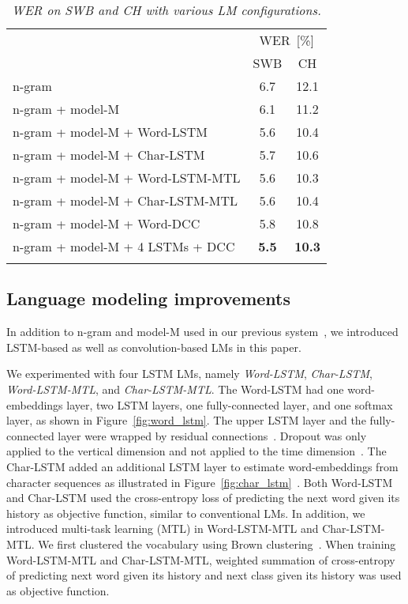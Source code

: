\documentclass[a4paper]{article}
\def\thline{\noalign{\hrule height 1pt}}
\begin{document}
\begin{table}[t]
 \begin{center}
  \begin{tabular*}{\columnwidth}{@{\extracolsep{\fill}}lcc}
   \thline
   ~&\multicolumn{2}{c}{WER~[\%]} \\
   ~& SWB & CH \\
   \thline
   n-gram & 6.7 & 12.1 \\
   n-gram + model-M & 6.1 & 11.2 \\
   \hline
   n-gram + model-M + Word-LSTM& 5.6 & 10.4 \\
   n-gram + model-M + Char-LSTM& 5.7 & 10.6 \\
   n-gram + model-M + Word-LSTM-MTL& 5.6 & 10.3 \\
   n-gram + model-M + Char-LSTM-MTL& 5.6 & 10.4 \\
   n-gram + model-M + Word-DCC& 5.8 & 10.8 \\
\hline
      n-gram + model-M + 4 LSTMs + DCC& {\bf 5.5} & {\bf 10.3} \\
\thline
  \end{tabular*}
  \caption{\it WER on SWB and CH with various LM configurations.}
  \label{tab:lm}
 \end{center}
	\end{table}

\subsection{Language modeling improvements}
\label{lm}
In addition to n-gram and model-M used in our previous system~\cite{saon16}, we introduced LSTM-based as well as convolution-based LMs in this paper.

We experimented with four LSTM LMs, namely {\it Word-LSTM}, {\it
  Char-LSTM}, {\it Word-LSTM-MTL}, and {\it Char-LSTM-MTL}.  The
Word-LSTM had one word-embeddings layer, two LSTM layers, one
fully-connected layer, and one softmax layer, as shown in
Figure~\ref{fig:word_lstm}. The upper LSTM layer and the
fully-connected layer were wrapped by residual
connections~\cite{he2016deep}.  Dropout was only applied to the
vertical dimension and not applied to the time
dimension~\cite{zaremba2014recurrent}.  The Char-LSTM added an additional
LSTM layer to estimate word-embeddings from character sequences as
illustrated in Figure~\ref{fig:char_lstm}~\cite{ling2015finding}.
Both Word-LSTM and Char-LSTM used the cross-entropy loss of predicting the next word
given its history as objective function, similar to conventional LMs.
In addition, we introduced multi-task learning (MTL) in Word-LSTM-MTL
and Char-LSTM-MTL.  We first clustered the vocabulary using Brown
clustering~\cite{brown1992class}.  When training Word-LSTM-MTL and
Char-LSTM-MTL, weighted summation of cross-entropy of predicting next
word given its history and next class given its history was used as
objective function.
\end{document}
